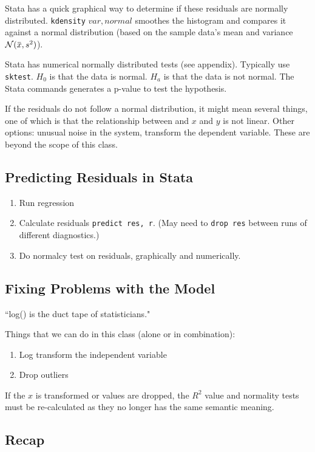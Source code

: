 \documentclass[11pt, oneside]{article}   	%
\newcommand{\overbar}[1]{\mkern 1.5mu\overline{\mkern-1.5mu#1\mkern-1.5mu}\mkern 1.5mu}
\begin{document}
Stata has a quick graphical way to determine if these residuals are normally distributed. \texttt{kdensity} $var, normal$ smoothes the histogram and compares it against a normal distribution (based on the sample data's mean and variance $\mathcal{N}(\overbar{x}, s^2)$).

Stata has numerical normally distributed tests (see appendix). Typically use \texttt{sktest}. $H_0$ is that the data is normal. $H_a$ is that the data is not normal. The Stata commands generates a p-value to test the hypothesis.

If the residuals do not follow a normal distribution, it might mean several things, one of which is that the relationship between and $x$ and $y$ is not linear. Other options: unusual noise in the system, transform the dependent variable. These are beyond the scope of this class.



\subsection{Predicting Residuals in Stata}

\begin{enumerate}
\item{Run regression}
\item{Calculate residuals \texttt{predict res, r}. (May need to \texttt{drop res} between runs of different diagnostics.)}
\item{Do normalcy test on residuals, graphically and numerically.}
\end{enumerate}

\subsection{Fixing Problems with the Model}

``log() is the duct tape of statisticians."

Things that we can do in this class (alone or in combination):
\begin{enumerate}
\item{Log transform the independent variable}
\item{Drop outliers}
\end{enumerate}

If the $x$ is transformed or values are dropped, the $R^2$ value and normality tests must be re-calculated as they no longer has the same semantic meaning. 

\subsection{Recap}
\end{document}
